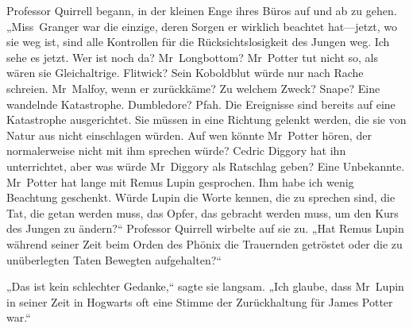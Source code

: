 Professor Quirrell begann, in der kleinen Enge ihres Büros auf und ab zu gehen. „Miss~Granger war die einzige, deren Sorgen er wirklich beachtet hat—jetzt, wo sie weg ist, sind alle Kontrollen für die Rücksichtslosigkeit des Jungen weg. Ich sehe es jetzt. Wer ist noch da? Mr~Longbottom? Mr~Potter tut nicht so, als wären sie Gleichaltrige. Flitwick? Sein Koboldblut würde nur nach Rache schreien. Mr~Malfoy, wenn er zurückkäme? Zu welchem Zweck? Snape? Eine wandelnde Katastrophe. Dumbledore? Pfah. Die Ereignisse sind bereits auf eine Katastrophe ausgerichtet. Sie müssen in eine Richtung gelenkt werden, die sie von Natur aus nicht einschlagen würden. Auf wen könnte Mr~Potter hören, der normalerweise nicht mit ihm sprechen würde? Cedric Diggory hat ihn unterrichtet, aber was würde Mr~Diggory als Ratschlag geben? Eine Unbekannte. Mr~Potter hat lange mit Remus Lupin gesprochen. Ihm habe ich wenig Beachtung geschenkt. Würde Lupin die Worte kennen, die zu sprechen sind, die Tat, die getan werden muss, das Opfer, das gebracht werden muss, um den Kurs des Jungen zu ändern?“
Professor Quirrell wirbelte auf sie zu.
„Hat Remus Lupin während seiner Zeit beim Orden des Phönix die Trauernden getröstet oder die zu unüberlegten Taten Bewegten aufgehalten?“

„Das ist kein schlechter Gedanke,“ sagte sie langsam. „Ich glaube, dass Mr~Lupin in seiner Zeit in Hogwarts oft eine Stimme der Zurückhaltung für James Potter war.“


